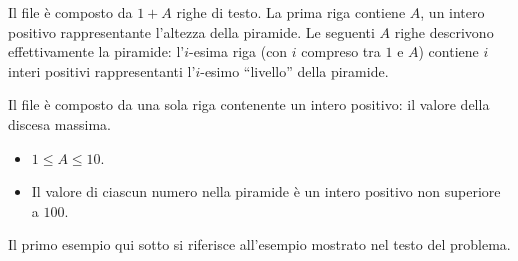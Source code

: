 \Input
Il file  è composto da $1+A$ righe di testo. La prima riga contiene $A$, un intero positivo rappresentante l'altezza della piramide. Le seguenti $A$ righe descrivono effettivamente la piramide: l'$i$-esima riga (con $i$ compreso tra $1$ e $A$) contiene $i$ interi positivi rappresentanti l'$i$-esimo ``livello'' della piramide.

\Output
Il file \outputfile{} è composto da una sola riga contenente un
intero positivo: il valore della discesa massima.

\Constraints
\begin{itemize}[nolistsep, itemsep=2mm]
  \item $1 \le A \le 10$.
  \item Il valore di ciascun numero nella piramide è un intero positivo non superiore a $100$.
\end{itemize}

\Examples
Il primo esempio qui sotto si riferisce all'esempio mostrato nel testo del problema.

\begin{example}
%
%
\end{example}

